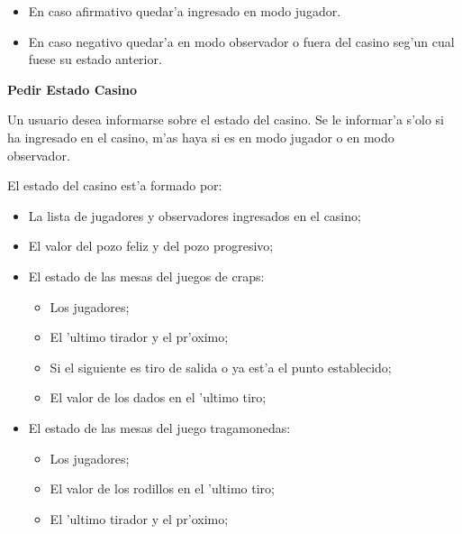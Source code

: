 \begin{itemize}
 \item En caso afirmativo quedar'a ingresado en modo jugador.
 \item En caso negativo quedar'a en modo observador o fuera del casino seg'un cual fuese su estado anterior.
\end{itemize}


\clearpage

\textbf{Pedir Estado Casino}

Un usuario desea informarse sobre el estado del casino. Se le informar'a s'olo si ha ingresado en el casino, m'as haya si es en modo jugador o en modo observador.

El estado del casino est'a formado por:

\begin{itemize}
 \item La lista de jugadores y observadores ingresados en el casino;
 \item El valor del pozo feliz y del pozo progresivo;
 \item El estado de las mesas del juegos de craps:
	\begin{itemize}
	 \item Los jugadores;
	 \item El 'ultimo tirador y el pr'oximo;
	 \item Si el siguiente es tiro de salida o ya est'a el punto establecido;
	 \item El valor de los dados en el 'ultimo tiro;
	\end{itemize}
 \item El estado de las mesas del juego tragamonedas:
	\begin{itemize}
 	 \item Los jugadores;
 	 \item El valor de los rodillos en el 'ultimo tiro;
 	 \item El 'ultimo tirador y el pr'oximo;
	\end{itemize}
\end{itemize}
